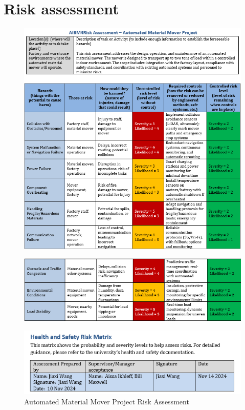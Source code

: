 \documentclass[12pt]{article}
\begin{document}
 \section{Risk assessment }
\begin{figure} [htbp] 
  \centering
    \includegraphics[width=0.85\linewidth]{risk 1.png}
\end{figure}
   
\begin{figure} [h]
     \centering   
    \includegraphics[width=0.85\linewidth]{risk 2.png}
    \end{figure}
\vspace{-2em}
    \begin{figure} [h]
        \centering
        \includegraphics[width=0.7\linewidth]{risk 3.png}
      \caption{Automated Material Mover Project Risk Assessment}
    \label{fig:risk_assessment}
\end{figure}
\end{document}

